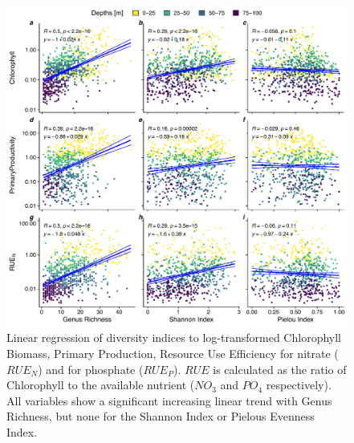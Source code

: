 \documentclass[draft]{agujournal2019}
\begin{document}
\begin{figure}
\label{fig:bdef}
\noindent\includegraphics[width=\textwidth]{fig/BDEF_depth_PLOT.pdf}
\caption{Linear regression of diversity indices to log-transformed Chlorophyll Biomass, Primary Production, Resource Use Efficiency for nitrate ($RUE_N$) and for phosphate ($RUE_P$). $RUE$ is calculated as the ratio of Chlorophyll to the available nutrient ($NO_3$ and $PO_4$ respectively). All variables show a significant increasing linear trend with Genus Richness, but none for the Shannon Index or Pielou\textquotesingle s Evenness Index.}
\end{figure}
\end{document}
